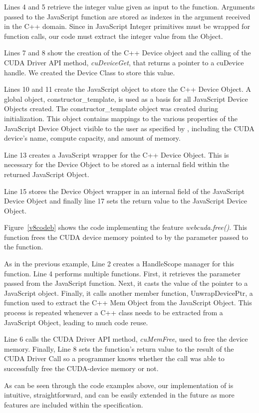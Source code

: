 Lines 4 and 5 retrieve the integer value given as
input to the function. Arguments passed to the JavaScript function are stored
as indexes in the argument received in the C++ domain. Since in JavaScript
Integer primitives must be wrapped for function calls, our code must extract the
integer value from the Object.

Lines 7 and 8 show the creation of the C++ Device object and the calling of the
CUDA Driver API method, \textit{cuDeviceGet}, that returns a pointer to a
cuDevice handle. We created the Device Class to store this value.

Lines 10 and 11 create the JavaScript object to store the C++ Device Object. A
global object, constructor\_template, is used as a basis for all JavaScript Device
Objects created. The constructor\_template object was created during
initialization. This object contains mappings to the various properties of the
JavaScript Device Object visible to the user as specified by \namens, including the
CUDA device's name, compute capacity, and amount of memory.

Line 13 creates a JavaScript wrapper for the C++ Device Object. This is
necessary for the Device Object to be stored as a internal field within the
returned JavaScript Object.

Line 15 stores the Device Object wrapper in an internal field of the JavaScript
Device Object and finally line 17 sets the return value to the JavaScript Device
Object.


Figure~\ref{v8codeb} shows the code implementing the \name feature
\textit{webcuda.free()}. This function frees the CUDA device memory pointed to by
the parameter passed to the function. 

As in the previous example, Line 2 creates a HandleScope manager for this
function.  Line 4 performs multiple functions. First, it retrieves the parameter
passed from the JavaScript function. Next, it casts the value of the pointer to
a JavaScript object. Finally, it calls another member function, UnwrapDevicePtr, a
function used to extract the C++ Mem Object from the JavaScript Object. This
process is repeated whenever a C++ class needs to be extracted from a JavaScript
Object, leading to much code reuse.

Line 6 calls the CUDA Driver API method, \textit{cuMemFree}, used to free the
device memory. Finally, Line 8 sets the function's return value to the result of
the CUDA Driver Call so a programmer knows whether the call was able to
successfully free the CUDA-device memory or not.


As can be seen through the code examples above, our implementation of \name is intuitive,
straightforward, and can be easily extended in the future as more features are
included within the \name specification.


